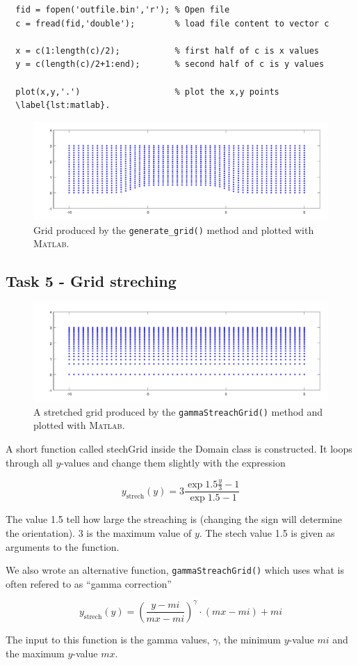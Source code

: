 \documentclass[paper=a4, fontsize=12pt]{article} %
\begin{document}
\begin{lstlisting}
  fid = fopen('outfile.bin','r'); % Open file
  c = fread(fid,'double');        % load file content to vector c

  x = c(1:length(c)/2);           % first half of c is x values
  y = c(length(c)/2+1:end);       % second half of c is y values

  plot(x,y,'.')                   % plot the x,y points
  \label{lst:matlab}.
\end{lstlisting}

\begin{figure}[H]
  \centering
  \includegraphics[width=\textwidth]{task4.pdf}
  \caption{Grid produced by the \texttt{generate\_grid()} method and plotted with \textsc{Matlab.}\label{fig:grid}}
\end{figure}

\subsection*{Task 5 - Grid streching}


\begin{figure}[H]
  \centering
  \includegraphics[width=\textwidth]{task5.pdf}
  \caption{A stretched grid produced by the \texttt{gammaStreachGrid()} method and plotted with \textsc{Matlab.}\label{fig:stretched}}
\end{figure}

A short function called stechGrid inside the Domain class is constructed. It loops through all $y$-values and change them slightly with the expression

$$ y_\textrm{strech}(y) = 3 \frac{\exp{1.5\frac{y}{3}}-1}{\exp{1.5}-1}$$

The value 1.5 tell how large the streaching is (changing the sign will determine the orientation). 3 is the maximum value of $y$. The stech value 1.5 is given as arguments to the function.

We also wrote an alternative function, \texttt{gammaStreachGrid()} which uses what is often refered to as ``gamma correction''

$$ y_\textrm{strech}(y) =  \left ( \frac{y-mi}{mx-mi}\right )^\gamma \cdot (mx-mi) + mi$$

The input to this function is the gamma values, $\gamma$, the minimum $y$-value $mi$ and the maximum $y$-value $mx$.
\end{document}
